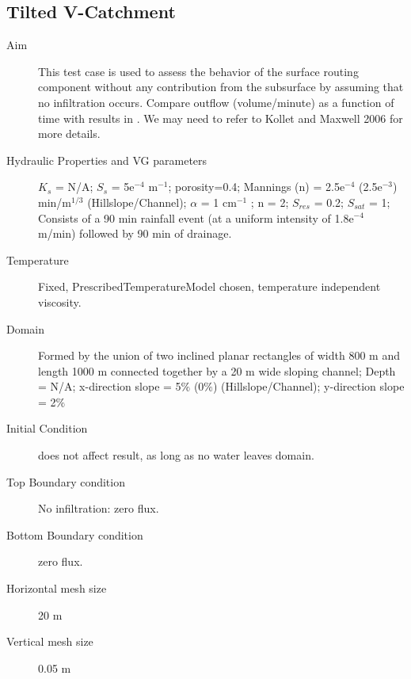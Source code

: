 \documentclass[twoside,10pt]{report}
\begin{document}
\subsection{Tilted V-Catchment}
\begin{description}
\item [Aim] This test case is used to assess the behavior of the surface routing component without any contribution from the subsurface by assuming that no infiltration occurs. Compare outflow (volume/minute) as a function of time with results in \citet{Maxwell14a}. We may need to refer to Kollet and Maxwell 2006 for more details.
\item [Hydraulic Properties and VG parameters] $K_s$ = N/A; $S_s$ = 5e$^{-4}$ m$^{-1}$; porosity=0.4; Mannings (n) = 2.5e$^{-4}$ (2.5e$^{-3}$) min/m$^{1/3}$ (Hillslope/Channel); $\alpha$ = 1 cm$^{-1}$ ; n = 2; $S_{res}$ = 0.2; $S_{sat}$ = 1; Consists
of a 90 min rainfall event (at a
uniform intensity of 1.8e$^{-4}$ m/min) followed by 90 min of drainage.
\item [Temperature] Fixed, PrescribedTemperatureModel chosen, temperature independent viscosity.
\item [Domain] Formed by the union of
two inclined planar rectangles of
width 800 m and length 1000 m connected
together by a 20 m wide sloping
channel; Depth = N/A; x-direction slope = 5$\%$ (0$\%$) (Hillslope/Channel); y-direction slope = 2$\%$
\item [Initial Condition] does not affect result, as long as no water leaves domain.
\item [Top Boundary condition] No infiltration: zero flux.
\item [Bottom Boundary condition] zero flux.
\item [Horizontal mesh size] 20 m
\item [Vertical mesh size] 0.05 m
\end{description}
\end{document}
